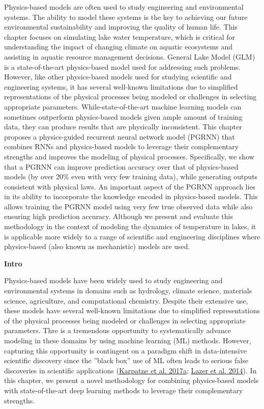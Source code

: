 \documentclass[book.tex]{subfiles}
\begin{document}
Physics-based models are often used to study engineering and
environmental systems. The ability to model these systems is the key to achieving our future environmental sustainability and improving the quality of human life. This chapter focuses on simulating lake water temperature, which is critical for understanding the impact of changing climate on aquatic ecosystems and assisting in aquatic resource management decisions. General Lake Model (GLM) is a state-of-the-art physics-based model used for addressing such problems. However, like other physics-based models used for studying scientific and engineering systems, it has several well-known limitations due to simplified representations of the physical processes being modeled
or challenges in selecting appropriate parameters.
While-state-of-the-art machine learning models can sometimes outperform physics-based models given ample amount of training data, they can produce results that are physically inconsistent. This chapter proposes a physics-guided recurrent neural network model (PGRNN) that combines RNNs
and physics-based models to leverage their complementary strengths and improves the modeling of physical processes. Specifically, we show that a PGRNN can improve prediction accuracy over that of physics-based models (by over 20\% even with very few training data), while generating
outputs consistent with physical laws. An important aspect of the PGRNN approach lies in its ability to incorporate the knowledge encoded in physics-based models. This allows training the PGRNN model using very few true observed data while also ensuring high prediction accuracy.
Although we present and evaluate this methodology in the context of
modeling the dynamics of temperature in lakes, it is applicable more
widely to a range of scientific and engineering disciplines where
physics-based (also known as mechanistic) models are used.

\textbf{Intro}


Physics-based models have been widely used to study engineering and
environmental systems in domains such as hydrology, climate science,
materials science, agriculture, and computational chemistry. Despite
their extensive use, these models have several well-known limitations
due to simplified representations of the physical processes being
modeled or challenges in selecting appropriate parameters. Thre is a
tremendous opportunity to systematically advance modeling in these
domains by using machine learning (ML) methods. However, capturing this
opportunity is contingent on a paradigm shift in data-intensive
scientific discovery since the ''black box'' use of ML often leads
to serious false discoveries in scientific applications
(\protect\hyperlink{page23}{Karpatne et al. 2017a};
\protect\hyperlink{page23}{Lazer et al. 2014}). In this chapter, we
present a novel methodology for combining physics-based models with
state-of-the-art deep learning methods to leverage their complementary
strengths.
\end{document}
